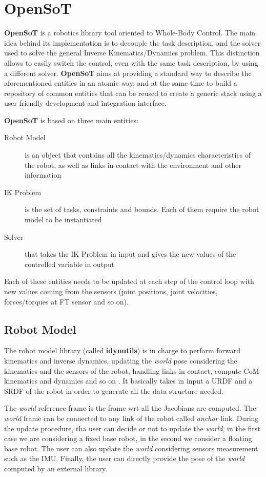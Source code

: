 \section{OpenSoT}
\label{sec:robot-Cartesian-control:opensot}
\textbf{OpenSoT} is a robotics library tool oriented to Whole-Body Control. The main idea behind its implementation is to decouple the task description, and the solver used to solve the general Inverse Kinematics/Dynamics problem. This distinction allows to easily switch the control, even with the same task description, by using a different solver. \textbf{OpenSoT} aims at providing a standard way to describe the aforementioned entities in an atomic way, and at the same time to build a repository of common entities that can be reused to create a generic stack using a user friendly development and integration interface.

\textbf{OpenSoT} is based on three main entities:
\begin{description}
    \item[Robot Model] is an object that contains all the kinematics/dynamics characteristics of the robot, as well as links in contact with the environment and other information
    \item[IK Problem] is the set of tasks, constraints and bounds. Each of them require the robot model to be instantiated
    \item[Solver] that takes the IK Problem in input and gives the new values of the controlled variable in output
\end{description}
Each of these entities needs to be updated at each step of the control loop with new values coming from the sensors (joint positions, joint velocities, forces/torques at FT sensor and so on). 

\subsection{Robot Model}
\label{sec:robot-Cartesian-control:opensot:sec:robot-model}
The robot model library (called \textbf{idynutils}) is in charge to perform forward kinematics and inverse dynamics, updating the \emph{world} pose considering the kinematics and the sensors of the robot, handling links in contact, compute CoM kinematics and dynamics and so on . It basically takes in input a URDF and a SRDF of the robot in order to generate all the data structure needed. 

The \emph{world} reference frame is the frame wrt all the Jacobians are computed. The \emph{world} frame can be connected to any link of the robot called \emph{anchor} link. During the update procedure, tha user can decide or not to update the \emph{world}, in the first case we are considering a fixed base robot, in the second we consider a floating base robot. The user can also update the \emph{world} considering sensors measurement such as the IMU. Finally, the user can directly provide the pose of the \emph{world} computed by an external library.

